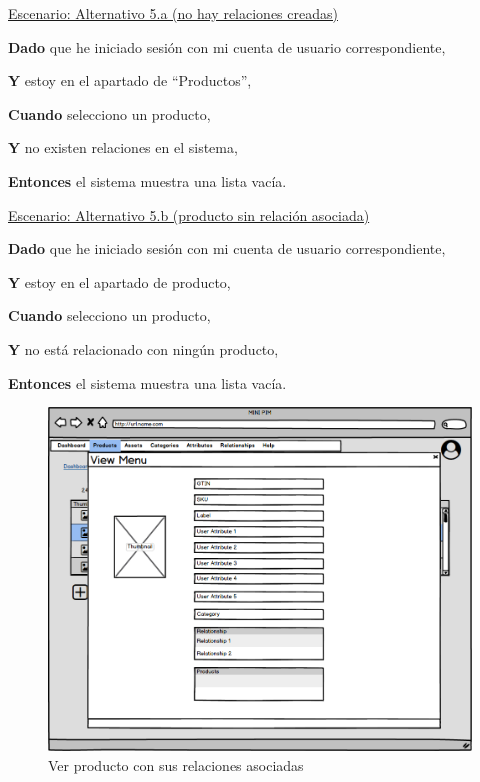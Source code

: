 \vspace{0.20cm}

\underline{Escenario: Alternativo 5.a (no hay relaciones creadas)}\par
\vspace{0.15cm}
\textbf{Dado} que he iniciado sesión con mi cuenta de usuario correspondiente,\par
\textbf{Y} estoy en el apartado de \enquote{Productos},\par
\textbf{Cuando} selecciono un producto,\par
\textbf{Y} no existen relaciones en el sistema,\par
\textbf{Entonces} el sistema muestra una lista vacía.\par

\vspace{0.20cm}

\underline{Escenario: Alternativo 5.b (producto sin relación asociada)}\par
\vspace{0.15cm}
\textbf{Dado} que he iniciado sesión con mi cuenta de usuario correspondiente,\par
\textbf{Y} estoy en el apartado de producto,\par
\textbf{Cuando} selecciono un producto,\par
\textbf{Y} no está relacionado con ningún producto,\par
\textbf{Entonces} el sistema muestra una lista vacía.\par

\vspace{0.20cm}

\begin{figure}[H]
    \includegraphics[width=1\linewidth]{assets/mockups/RF5.2_1.png}
    \caption{Ver producto con sus relaciones asociadas}
   \end{figure}
\vspace{1.0cm}

